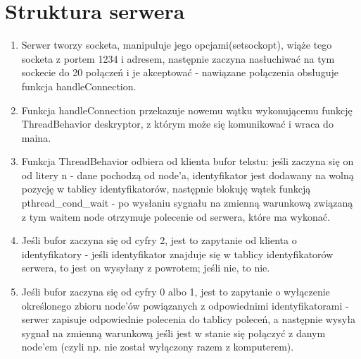 \documentclass[12pt]{article}
\begin{document}
\section{Struktura serwera}
\begin {enumerate}
	\item Serwer tworzy socketa, manipuluje jego opcjami(setsockopt), wiąże tego socketa z portem 1234 i adresem, następnie zaczyna nasłuchiwać na tym sockecie do 20 połączeń i je akceptować - nawiązane połączenia obsługuje funkcja handleConnection.
	\item Funkcja handleConnection przekazuje nowemu wątku wykonującemu funkcję ThreadBehavior deskryptor, z którym może się komunikować i wraca do maina.
	\item Funkcja ThreadBehavior odbiera od klienta bufor tekstu: jeśli zaczyna się on od litery n - dane pochodzą od node'a, identyfikator jest dodawany na wolną pozycję w tablicy identyfikatorów, następnie blokuję wątek funkcją pthread\_cond\_wait - po wysłaniu sygnału na zmienną warunkową związaną z tym waitem node otrzymuje polecenie od serwera, które ma wykonać.
	 \item Jeśli bufor zaczyna się od cyfry 2, jest to zapytanie od klienta o identyfikatory - jeśli identyfikator znajduje się w tablicy identyfikatorów serwera, to jest on wysyłany z powrotem; jeśli nie, to nie.
	 \item Jeśli bufor zaczyna się od cyfry 0 albo 1, jest to zapytanie o wyłączenie określonego zbioru node'ów powiązanych z odpowiednimi identyfikatorami - serwer zapisuje odpowiednie polecenia do tablicy poleceń, a następnie wysyła sygnał na zmienną warunkową jeśli jest w stanie się połączyć z danym node'em (czyli np. nie został wyłączony razem z komputerem).
	 
\end {enumerate}
\end{document}
